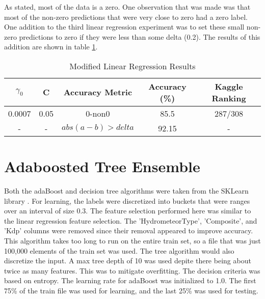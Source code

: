 \documentclass[pdftex,a4paper,12pt]{article}
\begin{document}
As stated, most of the data is a zero. One observation that was made was that most of the non-zero predictions that were very close to zero had a zero label. One addition to the third linear regression experiment was to set these small non-zero predictions to zero if they were less than some delta (0.2). The results of this addition are shown in table \ref{table:linAccModified}.
  \begin{table}[h]
        {\centering
          \begin{tabular}{|c|c|c|c|c|}
            \hline
             $\gamma_0$ & C & Accuracy Metric & Accuracy (\%) & Kaggle Ranking\\
            \hline
                0.0007 &   0.05        & 0-non0 & 85.5 & 287/308 \\
             \hline
                - &   -        & $abs(a - b) > delta$ & 92.15 & - \\
                  \hline
          \end{tabular}
          \caption{Modified Linear Regression Results}          
          \label{table:linAccModified}}
  \end{table}


\section{Adaboosted Tree Ensemble}
Both the adaBoost and decision tree algorithms were taken from the SKLearn library \cite{scikit-learn}. For learning, the labels were discretized into buckets that were ranges over an interval of size 0.3. The feature selection performed here was similar to the linear regression feature selection. The 'HydrometeorType', 'Composite', and 'Kdp' columns were removed since their removal appeared to improve accuracy. This algorithm takes too long to run on the entire train set, so a file that was just 100,000 elements of the train set was used. The tree algorithm would also discretize the input. A max tree depth of 10 was used depite there being about twice as many features. This was to mitigate overfitting. The decision criteria was based on entropy. The learning rate for adaBoost was initialized to 1.0. The first 75\% of the train file was used for learning, and the last 25\% was used for testing.
\end{document}
